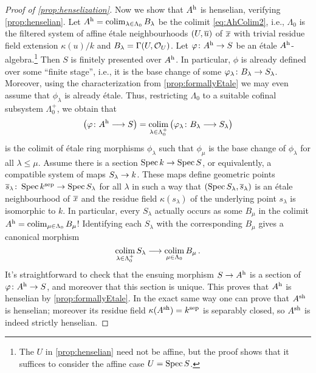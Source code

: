 \begin{proof}[Proof of \cref{prop:henselization}]
	Now we show that $A^{\mathrm{h}}$ is henselian, verifying \cref{prop:henselian}. Let $A^{\mathrm{h}}=\operatorname*{colim}_{\lambda\in\Lambda_0}B_\lambda$ be the colimit \cref{eq:AhColim2}, i.e., $\Lambda_0$ is the filtered system of affine étale neighbourhoods $(U,\ov{u})$ of $\ov{x}$ with trivial residue field extension $\kappa(u)/k$ and $B_\lambda=\operatorname{\Gamma}(U,\mathcal{O}_U)$. Let $\phi\colon A^\h\morphism S$ be an étale $A^{\mathrm{h}}$-algebra.\footnote{The $U$ in \cref{prop:henselian} need not be affine, but the proof shows that it suffices to consider the affine case $U=\operatorname{Spec} S$.} Then $S$ is finitely presented over $A^{\mathrm{h}}$. In particular, $\phi$ is already defined over some \enquote{finite stage}, i.e., it is the base change of some $\phi_\lambda\colon B_\lambda\morphism S_\lambda$. Moreover, using the characterization from \cref{prop:formallyEtale} we may even assume that $\phi_\lambda$ is already étale. Thus, restricting $\Lambda_0$ to a suitable cofinal subsystem $\Lambda_0^+$, we obtain that 
	\begin{equation*}
		\left(\phi\colon A^\h\morphism S\right)=\colimit_{\lambda\in\Lambda_0^+}\big(\phi_\lambda\colon B_\lambda\morphism S_\lambda\big)
	\end{equation*}
	is the colimit of étale ring morphisms $\phi_\lambda$ such that $\phi_\mu$ is the base change of $\phi_\lambda$ for all $\lambda\leq \mu$. Assume there is a section $\Spec k\morphism \Spec S$, or equivalently, a compatible system of maps $S_\lambda\morphism k$. These maps define geometric points $\ov{s}_\lambda\colon \Spec k^\sep \morphism\Spec S_\lambda$ for all $\lambda$ in such a way that $(\Spec S_\lambda,\ov{s}_\lambda)$ is an étale neighbourhood of $\ov{x}$ and the residue field $\kappa(s_\lambda)$ of the underlying point $s_\lambda$ is isomorphic to $k$. In particular, every $S_\lambda$ actually occurs as some $B_\mu$ in the colimit $A^{\mathrm{h}}=\operatorname*{colim}_{\mu\in\Lambda_0}B_\mu$! Identifying each $S_\lambda$ with the corresponding $B_\mu$ gives a canonical morphism
	\begin{equation*}
		\colimit_{\lambda\in\Lambda_0^+}S_\lambda \morphism \colimit_{\mu\in\Lambda_0}B_\mu\,.
	\end{equation*}
	It's straightforward to check that the ensuing morphism $S\morphism A^\h$ is a section of $\phi\colon A^\h\morphism S$, and moreover that this section is unique. This proves that $A^{\mathrm{h}}$ is henselian by \cref{prop:formallyEtale}. In the exact same way one can prove that $A^{\mathrm{sh}}$ is henselian; moreover its residue field $\kappa(A^{\mathrm{sh}})=k^{\mathrm{sep}}$ is separably closed, so $A^{\mathrm{sh}}$ is indeed strictly henselian.
	

\end{proof}
